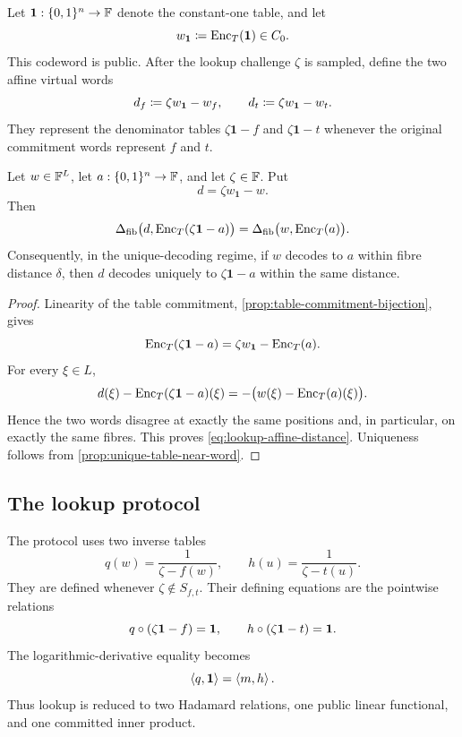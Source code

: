 Let $\mathbf 1:\{0,1\}^n\to\mathbb{F}$ denote the constant-one table, and let
\begin{equation}
  w_{\mathbf1}\coloneqq\operatorname{Enc}_T(\mathbf1)\in C_0.
  \label{eq:lookup-one-word}
\end{equation}
This codeword is public.  After the lookup challenge $\zeta$ is sampled, define the two affine virtual words
\begin{equation}
  d_f\coloneqq \zeta w_{\mathbf1}-w_f,
  \qquad
  d_t\coloneqq \zeta w_{\mathbf1}-w_t.
  \label{eq:lookup-affine-words}
\end{equation}
They represent the denominator tables $\zeta\mathbf1-f$ and $\zeta\mathbf1-t$ whenever the original commitment words represent $f$ and $t$.

\begin{lemma}
\label{lem:lookup-affine-decoding}
Let $w\in\mathbb{F}^L$, let $a:\{0,1\}^n\to\mathbb{F}$, and let $\zeta\in\mathbb{F}$.  Put
\[
  d=\zeta w_{\mathbf1}-w.
\]
Then
\begin{equation}
  \Delta_{\mathrm{fib}}
  \bigl(d,\operatorname{Enc}_T(\zeta\mathbf1-a)\bigr)
  =
  \Delta_{\mathrm{fib}}\bigl(w,\operatorname{Enc}_T(a)\bigr).
  \label{eq:lookup-affine-distance}
\end{equation}
Consequently, in the unique-decoding regime, if $w$ decodes to $a$ within fibre distance $\delta$, then $d$ decodes uniquely to $\zeta\mathbf1-a$ within the same distance.
\end{lemma}

\begin{proof}
Linearity of the table commitment, \cref{prop:table-commitment-bijection}, gives
\[
  \operatorname{Enc}_T(\zeta\mathbf1-a)
  =\zeta w_{\mathbf1}-\operatorname{Enc}_T(a).
\]
For every $\xi\in L$,
\[
  d(\xi)-\operatorname{Enc}_T(\zeta\mathbf1-a)(\xi)
  =-\bigl(w(\xi)-\operatorname{Enc}_T(a)(\xi)\bigr).
\]
Hence the two words disagree at exactly the same positions and, in particular, on exactly the same fibres.  This proves \eqref{eq:lookup-affine-distance}.  Uniqueness follows from \cref{prop:unique-table-near-word}.
\end{proof}

\subsection{The lookup protocol}
\label{sec:lookup-protocol}

The protocol uses two inverse tables
\begin{equation}
  q(w)=\frac{1}{\zeta-f(w)},
  \qquad
  h(u)=\frac{1}{\zeta-t(u)}.
  \label{eq:lookup-inverse-tables}
\end{equation}
They are defined whenever $\zeta\notin S_{f,t}$.  Their defining equations are the pointwise relations
\begin{equation}
  q\circ(\zeta\mathbf1-f)=\mathbf1,
  \qquad
  h\circ(\zeta\mathbf1-t)=\mathbf1.
  \label{eq:lookup-inverse-hadamards}
\end{equation}
The logarithmic-derivative equality becomes
\begin{equation}
  \left\langle q,\mathbf1\right\rangle=\left\langle m,h\right\rangle.
  \label{eq:lookup-inner-product-equality}
\end{equation}
Thus lookup is reduced to two Hadamard relations, one public linear functional, and one committed inner product.

